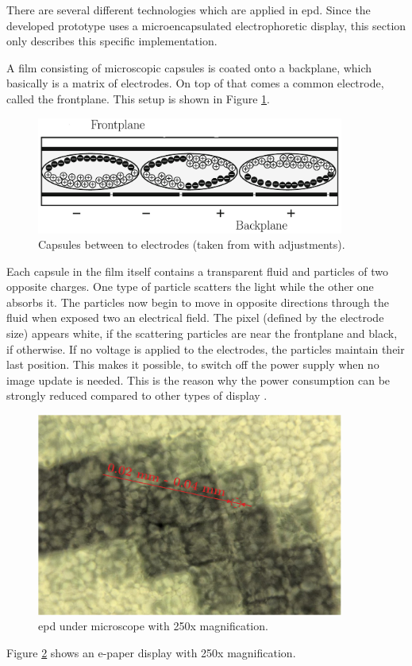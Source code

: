 There are several different technologies which are applied in \acl{epd}.
Since the developed prototype uses a microencapsulated electrophoretic display, this section only describes this specific implementation.

A film consisting of microscopic capsules is coated onto a backplane, which basically is a matrix of electrodes.
On top of that comes a common electrode, called the frontplane.
This setup is shown in Figure \ref{theory:capsules}.

\begin{figure}[ht]
	\centering
	\includegraphics[width=0.9\textwidth]{2-theory/e-paper-display/graphics/capsules.pdf}
	\caption{Capsules between to electrodes (taken from \cite{amundson} with adjustments).\label{theory:capsules}}
\end{figure}

Each capsule in the film itself contains a transparent fluid and particles of two opposite charges.
One type of particle scatters the light while the other one absorbs it.
The particles now begin to move in opposite directions through the fluid when exposed two an electrical field. 
The pixel (defined by the electrode size) appears white, if the scattering particles are near the frontplane and black, if otherwise.
If no voltage is applied to the electrodes, the particles maintain their last position.
This makes it possible, to switch off the power supply when no image update is needed. 
This is the reason why the power consumption can be strongly reduced compared to other types of display \cite{amundson}.

\begin{figure}[ht]
	\centering
	\includegraphics[width=0.9\textwidth]{2-theory/e-paper-display/graphics/epaper_mikroskop.pdf}
	\caption{\acl{epd} under microscope with 250x magnification.\label{theory:micro}}
\end{figure}

Figure \ref{theory:micro} shows an e-paper display with 250x magnification.